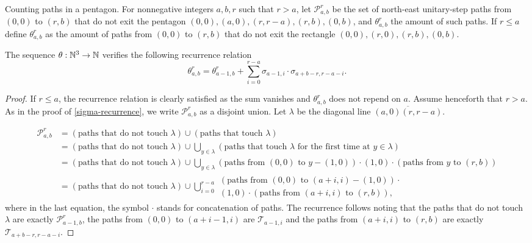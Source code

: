  \begin{subsubsection}{Counting paths in a pentagon.} For nonnegative integers $a,b,r$ such that $r>a$, let $\mathcal{P}_{a,b}^r$ be the set of north-east unitary-step paths from $(0,0)$ to $(r,b)$ that do not exit the pentagon $(0,0),(a,0),(r,r-a),(r,b),(0,b)$, and $\theta_{a,b}^r$ the amount of such paths. If $r\leq a$ define $\theta_{a,b}^r$ as the amount of paths from $(0,0)$ to $(r,b)$ that do not exit the rectangle $(0,0),(r,0),(r,b),(0,b)$.
\begin{myprop}
    The sequence $\theta:\mathbb{N}^3\to \mathbb{N}$ verifies the following recurrence relation
    $$
    \displaystyle \theta_{a,b}^r = \theta_{a-1,b}^r + \sum_{i=0}^{r-a}\sigma_{a-1,i}\cdot \sigma_{a+b-r,r-a-i}.
    $$
 \end{myprop}
 \begin{proof}
     If $r\leq a$, the recurrence relation is clearly satisfied as the sum vanishes and $\theta_{a,b}^r$ does not repend on $a$. Assume henceforth that $r>a$. 
 As in the proof of \ref{sigma-recurrence}, we write $\mathcal{P}_{a,b}^r$ as a disjoint union. Let $\lambda$ be the diagonal line $\overline{(a,0)(r,r-a)}$.

 \begin{align*}
 \mathcal{P}_{a,b}^r &= (\mbox{paths that do not touch }\lambda)\cup (\mbox{paths that touch }\lambda)\\
                     &= (\mbox{paths that do not touch }\lambda)\cup \bigcup_{y\in \lambda} (\mbox{paths that touch }\lambda\mbox{ for the first time at $y\in \lambda$})\\
                     &= (\mbox{paths that do not touch }\lambda)\cup \bigcup_{y\in \lambda} (\mbox{paths from }(0,0)\mbox{ to }y-(1,0))\cdot (1,0)\cdot (\mbox{paths from }y\mbox{ to }(r,b))\\
                     &= (\mbox{paths that do not touch }\lambda)\cup \bigcup_{i = 0}^{r-a} \begin{array}{l}(\mbox{paths from }(0,0)\mbox{ to }(a+i,i)-(1,0))\cdot\\ (1,0)\cdot (\mbox{paths from }(a+i,i)\mbox{ to }(r,b)),\end{array}
 \end{align*}
 where in the last equation, the symbol $\cdot$ stands for concatenation of paths. The recurrence follows noting that the paths that do not touch $\lambda$ are exactly $\mathcal{P}_{a-1,b}^r$, the paths from $(0,0)$ to $(a+i-1,i)$ are $\mathcal{T}_{a-1,i}$ and the paths from $(a+i,i)$ to $(r,b)$ are exactly $\mathcal{T}_{a+b-r,r-a-i}$. \end{proof}



\end{subsubsection}
